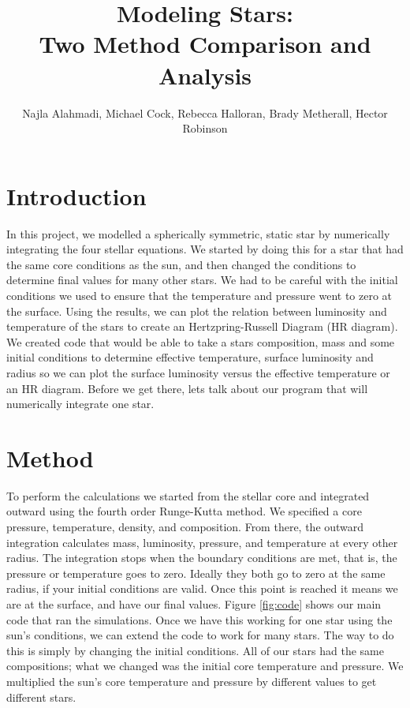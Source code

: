 \documentclass[10pt]{article}
\title{Modeling Stars: \\ Two Method Comparison and Analysis}
\author{Najla Alahmadi, Michael Cock, Rebecca Halloran, Brady Metherall, Hector Robinson}
\begin{document}
\maketitle

\lstset{style=mystyle}
\section{Introduction}
In this project, we modelled a spherically symmetric, static star by numerically integrating the four stellar equations. We started by doing this for a star that had the same core conditions as the sun, and then changed the conditions to determine final values for many other stars. We had to be careful with the initial conditions we used to ensure that the temperature and pressure went to zero at the surface. Using the results, we can plot the relation between luminosity and temperature of the stars to create an Hertzpring-Russell Diagram (HR diagram). We created code that would be able to take a stars composition, mass and some initial conditions to determine effective temperature, surface luminosity and radius so we can plot the surface luminosity versus the effective temperature or an HR diagram. Before we get there, lets talk about our program that will numerically integrate one star. \\

\section{Method}
To perform the calculations we started from the stellar core and integrated outward using the fourth order Runge-Kutta method. We specified a core pressure, temperature, density, and composition. From there, the outward integration calculates mass, luminosity, pressure, and temperature at every other radius. The integration stops when the boundary conditions are met, that is, the pressure or temperature goes to zero. Ideally they both go to zero at the same radius, if your initial conditions are valid. Once this point is reached it means we are at the surface, and have our final values. Figure \ref{fig:code} shows our main code that ran the simulations. Once we have this working for one star using the sun's conditions, we can extend the code to work for many stars. The way to do this is simply by changing the initial conditions. All of our stars had the same compositions; what we changed was the initial core temperature and pressure. We multiplied the sun's core temperature and pressure by different values to get different stars.\\
\end{document}

